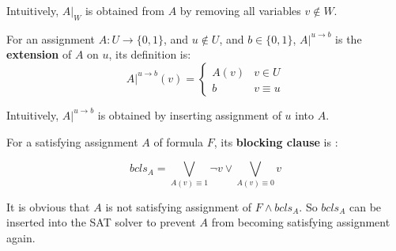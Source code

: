 \documentclass[journal]{IEEEtran}
\begin{document}
Intuitively, $A|_W$ is obtained from $A$ by removing all variables $v\notin W$.

For an assignment $A:U\to \{0,1\}$, and $u\notin U$, and $b\in \{0,1\}$, $A|^{u\to b}$ is the \textbf{extension} of $A$ on $u$,
its definition is:
\begin{displaymath}
A|^{u\to b}(v) = \left\{ \begin{array}{ll}
A(v) & v\in U \\
b & v\equiv u
\end{array}
\right.
\end{displaymath}

Intuitively, $A|^{u\to b}$ is obtained by inserting assignment of $u$ into $A$.



For a satisfying assignment $A$ of formula $F$,
its \textbf{blocking clause} is :

\begin{equation}\label{BCLS}
bcls_A=\bigvee _{A(v)\equiv 1}\neg v\vee \bigvee _{A(v)\equiv 0}v
\end{equation}

It is obvious that $A$ is not satisfying assignment of $F\wedge bcls_A$.
So $bcls_A$ can be inserted into the SAT solver to prevent $A$ from becoming satisfying assignment again.
\end{document}
